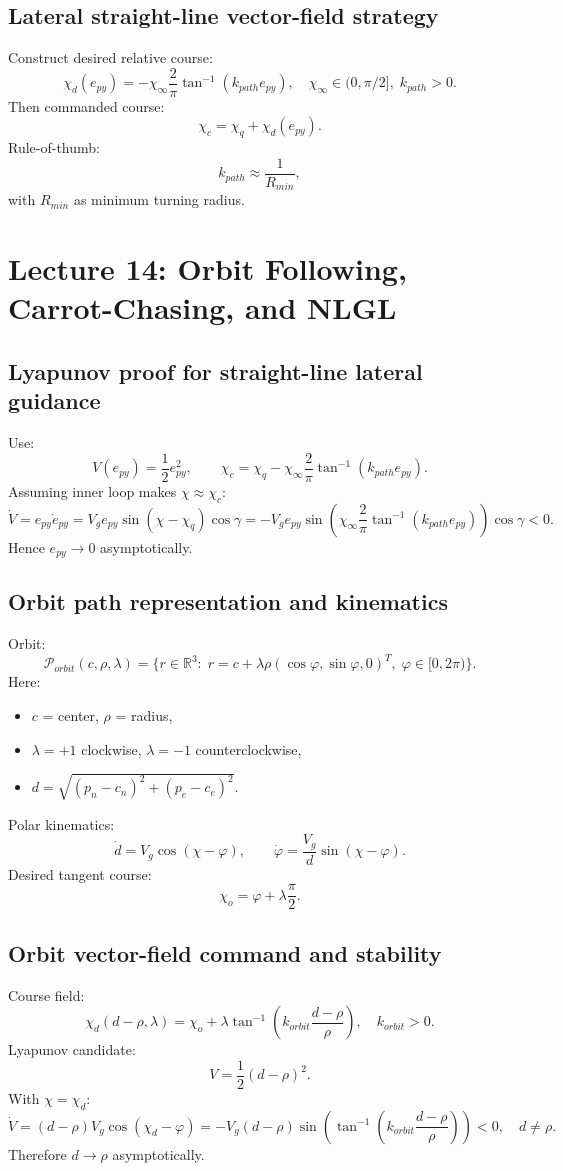 \documentclass[11pt,a4paper]{article}
\newcommand{\R}{\mathbb{R}}
\begin{document}
\subsection{Lateral straight-line vector-field strategy}
Construct desired relative course:
\[
\chi_d(e_{py})=-\chi_\infty\frac{2}{\pi}\tan^{-1}(k_{path}e_{py}),
\quad
\chi_\infty\in(0,\pi/2],\;k_{path}>0.
\]
Then commanded course:
\[
\chi_c=\chi_q+\chi_d(e_{py}).
\]
Rule-of-thumb:
\[
k_{path}\approx \frac{1}{R_{min}},
\]
with $R_{min}$ as minimum turning radius.

\newpage
\section{Lecture 14: Orbit Following, Carrot-Chasing, and NLGL}

\subsection{Lyapunov proof for straight-line lateral guidance}
Use:
\[
V(e_{py})=\frac{1}{2}e_{py}^2,\qquad
\chi_c=\chi_q-\chi_\infty\frac{2}{\pi}\tan^{-1}(k_{path}e_{py}).
\]
Assuming inner loop makes $\chi\approx\chi_c$:
\[
\dot V=e_{py}\dot e_{py}
=V_g e_{py}\sin(\chi-\chi_q)\cos\gamma
=-V_g e_{py}\sin\!\left(\chi_\infty\frac{2}{\pi}\tan^{-1}(k_{path}e_{py})\right)\cos\gamma<0.
\]
Hence $e_{py}\to 0$ asymptotically.

\subsection{Orbit path representation and kinematics}
Orbit:
\[
\mathcal{P}_{orbit}(c,\rho,\lambda)=\{r\in\R^3:\; r=c+\lambda\rho(\cos\varphi,\sin\varphi,0)^T,\;\varphi\in[0,2\pi)\}.
\]
Here:
\begin{itemize}
  \item $c$ = center, $\rho$ = radius,
  \item $\lambda=+1$ clockwise, $\lambda=-1$ counterclockwise,
  \item $d=\sqrt{(p_n-c_n)^2+(p_e-c_e)^2}$.
\end{itemize}
Polar kinematics:
\[
\dot d=V_g\cos(\chi-\varphi),\qquad
\dot\varphi=\frac{V_g}{d}\sin(\chi-\varphi).
\]
Desired tangent course:
\[
\chi_o=\varphi+\lambda\frac{\pi}{2}.
\]

\subsection{Orbit vector-field command and stability}
Course field:
\[
\chi_d(d-\rho,\lambda)=\chi_o+\lambda\tan^{-1}\!\left(k_{orbit}\frac{d-\rho}{\rho}\right),\quad k_{orbit}>0.
\]
Lyapunov candidate:
\[
V=\frac{1}{2}(d-\rho)^2.
\]
With $\chi=\chi_d$:
\[
\dot V=(d-\rho)V_g\cos(\chi_d-\varphi)
=-V_g(d-\rho)\sin\!\left(\tan^{-1}\!\left(k_{orbit}\frac{d-\rho}{\rho}\right)\right)<0,\quad d\neq \rho.
\]
Therefore $d\to \rho$ asymptotically.
\end{document}
